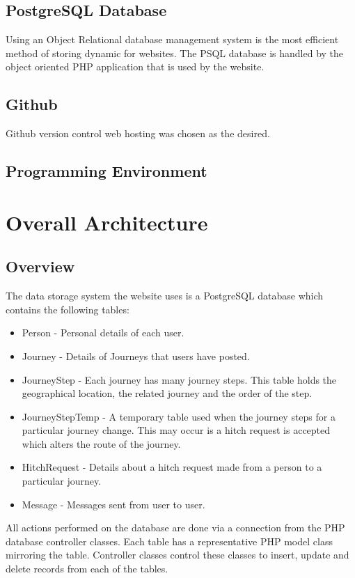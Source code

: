 	\subsection{PostgreSQL Database}
	Using an Object Relational database management system is the most efficient method of storing dynamic for websites. The PSQL database is handled by the object oriented PHP application that is used by the website.
	
	\subsection{Github}
		Github \cite{github} version control web hosting was chosen as the desired.
		
	\subsection{Programming Environment}
	
		 
\section{Overall Architecture}
	\subsection{Overview}	
		The data storage system the website uses is a PostgreSQL database which contains the following tables:
		\begin{itemize}
		\item Person - Personal details of each user.
		\item Journey - Details of Journeys that users have posted.
		\item Journey\textunderscore Step - Each journey has many journey steps. This table holds the geographical location, the related journey and the order of the step.
		\item Journey\textunderscore Step\textunderscore Temp - A temporary table used when the journey steps for a particular journey change. This may occur is a hitch request is accepted which alters the route of the journey.
		\item Hitch\textunderscore Request - Details about a hitch request made from a person to a particular journey.
		\item Message - Messages sent from user to user.
		\end{itemize}
		
		All actions performed on the database are done via a connection from the PHP database controller classes. Each table has a representative PHP model class mirroring the table. Controller classes control these classes to insert, update and delete records from each of the tables.
		
